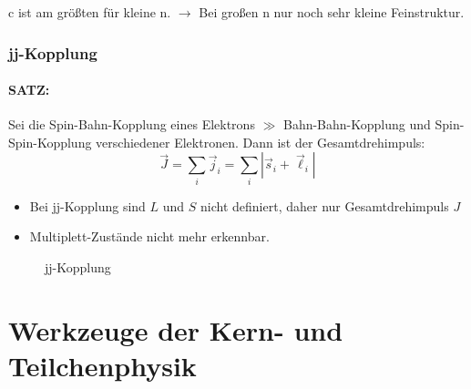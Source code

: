 \documentclass[Ex4_Zusammenfassung.tex]{subfiles}
\begin{document}
c ist am größten für kleine n. $\rightarrow$ Bei großen n nur noch sehr kleine Feinstruktur.
\newpage
\subsection*{jj-Kopplung}

\subsubsection*{SATZ:}
Sei die Spin-Bahn-Kopplung eines Elektrons $\gg$ Bahn-Bahn-Kopplung und Spin-Spin-Kopplung verschiedener Elektronen. Dann ist der Gesamtdrehimpuls:
$$ \vec{J} = \sum_i \vec{j}_i = \sum_i \left| \vec{s}_i + \vec{\ell}_i \right|$$

\begin{itemize}
	\item Bei jj-Kopplung sind $L$ und $S$ nicht definiert, daher nur Gesamtdrehimpuls $J$
	\item Multiplett-Zustände nicht mehr erkennbar.
\end{itemize}

\begin{figure}[!h]
	\centering
	\caption{jj-Kopplung}
\end{figure}

\chapter{Werkzeuge der Kern- und Teilchenphysik} 
\end{document}
